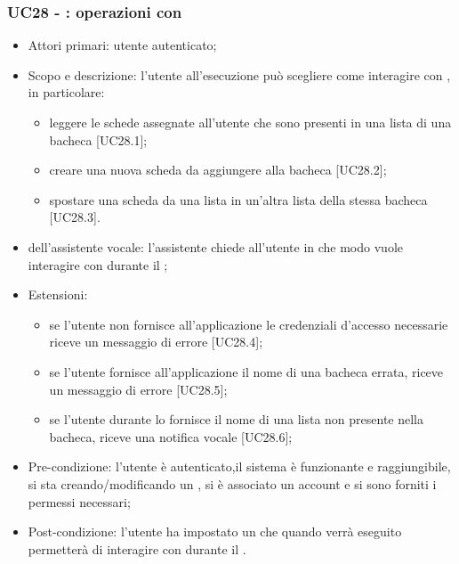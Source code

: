 \subsubsection{UC28 - : operazioni con }
\begin{itemize}
	\item  Attori primari: utente autenticato;
	\item  Scopo e descrizione: l'utente all'esecuzione può scegliere come interagire con , in particolare:
		   \begin{itemize}
				\item leggere le schede assegnate all'utente che sono presenti in una lista di una bacheca [UC28.1];
				\item creare una nuova scheda da aggiungere alla bacheca [UC28.2];
				\item spostare una scheda da una lista in un'altra lista della stessa bacheca [UC28.3].
		   \end{itemize}
	\item  {} dell'assistente vocale: l'assistente chiede all'utente in che modo vuole interagire con  durante il ;
	\item  Estensioni: 
		   \begin{itemize}
				\item se l'utente non fornisce all'applicazione le credenziali d'accesso necessarie riceve un messaggio di errore [UC28.4];
				\item se l'utente fornisce all'applicazione il nome di una bacheca errata, riceve un messaggio di errore [UC28.5];
				\item se l'utente durante lo  fornisce il nome di una lista non presente nella bacheca, riceve una notifica vocale [UC28.6];
		   \end{itemize}
	\item  Pre-condizione: l'utente è autenticato,il sistema è funzionante e raggiungibile, si sta creando/modificando un , si è associato un account  e si sono forniti i permessi necessari;
	\item  Post-condizione: l'utente ha impostato un  che quando verrà eseguito permetterà di interagire con  durante il .
\end{itemize}

